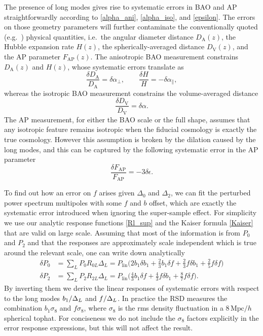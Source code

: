 \documentclass[a4paper,11pt]{article}
\let\d\relax
\DeclareMathOperator{\d}{d}
\newcommand{\Dist}[1]{D_\mathrm{#1}}
\newcommand{\FAP}{F_\mathrm{AP}}
\newcommand{\Plin}{P_\lin}
\newcommand{\Mpc}{\mathrm{Mpc}}
\newcommand{\Mpch}{{\,\Mpc/h}}
\newcommand{\lin}{\mathrm{lin}}
\begin{document}
The presence of long modes gives rise to systematic errors in BAO and AP
straightforwardly according to \eqref{alpha_ani}, \eqref{alpha_iso}, and
\eqref{epsilon}.
The errors on those geometry parameters will further contaminate the
conventionally quoted (e.g.\ \cite{AlamEtAl17, BeutlerEtAl17}) physical
quantities, i.e.\ the angular diameter distance $\Dist{A}(z)$, the Hubble
expansion rate $H(z)$, the spherically-averaged distance $\Dist{V}(z)$, and the
AP parameter $\FAP(z)$.
The anisotropic BAO measurement constrains $\Dist{A}(z)$ and $H(z)$, whose
systematic errors translate as
\begin{equation}
    \label{BAO_ani}
    \frac{\delta\Dist{A}}{\Dist{A}} = \delta\alpha_\perp,
    \qquad
    \frac{\delta H}H = - \delta\alpha_\parallel,
\end{equation}
whereas the isotropic BAO measurement constrains the volume-averaged distance
\begin{equation}
    \label{BAO_iso}
    \frac{\delta\Dist{V}}{\Dist{V}} = \delta\alpha.
\end{equation}
The AP measurement, for either the BAO scale or the full shape, assumes that
any isotropic feature remains isotropic when the fiducial cosmology is exactly
the true cosmology.
However this assumption is broken by the dilation caused by the
long modes, and this can be captured by the following systematic error in the
AP parameter
\begin{equation}
    \frac{\delta \FAP}{\FAP} = - 3 \delta\epsilon.
\end{equation}

To find out how an error on $f$ arises given $\Delta_0$ and $\Delta_2$, we can fit
the perturbed power spectrum multipoles with some $f$ and $b$ offset, which are
exactly the systematic error introduced when ignoring the super-sample effect.
For simplicity we use our analytic response functions \eqref{Rl_sup} and the
Kaiser formula \eqref{Kaiser} that are valid on large scale.
Assuming that most of the information is from $P_0$ and $P_2$ and that the
responses are approximately scale independent which is true around the relevant
scale, one can write down analytically
\begin{align}
    \delta P_0 &= \sum_L P_0 R_{0L} \Delta_L =
    \Plin \bigl( 2b_1\delta b_1 + \frac23b_1\delta f + \frac23f\delta b_1
        + \frac25f\delta f \bigr) \nonumber\\
    \delta P_2 &= \sum_L P_2 R_{2L} \Delta_L =
    \Plin \bigl( \frac43b_1\delta f + \frac43f\delta b_1 + \frac87f\delta f \bigr).
\end{align}
By inverting them we derive the linear responses of systematic errors with
respect to the long modes $\d b_1/\d\Delta_L$ and $\d f/\d\Delta_L$.
In practice the RSD measures the combination $b_1\sigma_8$ and $f\sigma_8$,
where $\sigma_8$ is the rms density fluctuation in a $8\Mpch$ spherical tophat.
For conciseness we do not include the $\sigma_8$ factors explicitly in the
error response expressions, but this will not affect the result.
\end{document}
